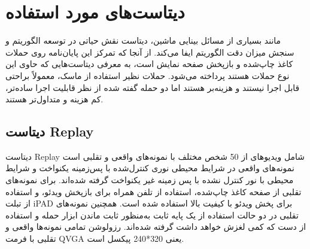   \section{دیتاست‌های مورد استفاده}
  مانند بسیاری از مسائل بینایی ماشین، دیتاست نقش حیاتی در توسعه الگوریتم و سنجش میزان دقت الگوریتم ایفا می‌کند. از آنجا که تمرکز این پایان‌نامه روی حملات کاغذ چاپ‌شده و بازپخش صفحه نمایش است، به معرفی دیتاست‌هایی که حاوی این نوع حملات هستند پرداخته می‌شود. حملات نظیر استفاده از ماسک، معمولاً براحتی قابل اجرا نیستند و هزینه‌بر هستند اما دو حمله گفته شده از نظر قابلیت اجرا ساده‌تر، کم هزینه و متداول‌تر هستند. 
\subsection{دیتاست Replay}
دیتاست Replay شامل ویدیوهای از 50 شخص مختلف با نمونه‌های واقعی و تقلبی است
\cite{chingovska2012effectiveness}
 نمونه‌های واقعی در شرایط محیطی نوری کنترل‌شده با پس‌زمینه یکنواخت و شرایط محیطی با نور کنترل نشده با پس زمینه غیر یکنواخت گرفته شده‌اند. برای نمونه‌های تقلبی از صفحه کاغذ چاپ‌شده، استفاده از تلفن همراه برای بازپخش ویدئو، و استفاده از تبلت iPAD برای پخش ویدئو با کیفیت بالا استفاده شده است. همچنین نمونه‌های تقلبی در دو حالت استفاده از یک پایه ثابت به‌منظور ثابت ماندن ابزار حمله و استفاده از دست که کمی لغزش خواهد داشت گرفته شده‌اند. رزولوشن تمامی نمونه‌ها واقعی و تقلبی با فرمت QVGA یعنی 320*240 پیکسل است.








 











 












